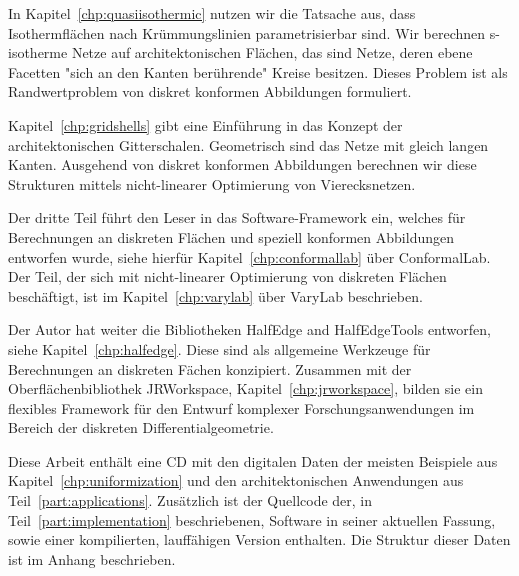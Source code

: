 \documentclass[Thesis.tex]{subfiles}
\begin{document}
In Kapitel~\ref{chp:quasiisothermic} nutzen wir die Tatsache aus, dass Isothermfl\"{a}chen nach Kr\"{u}mmungslinien parametrisierbar sind.
Wir berechnen s-isotherme Netze auf architektonischen Fl\"{a}chen, das sind Netze, deren ebene Facetten "sich an den Kanten ber\"{u}hrende" Kreise besitzen.
Dieses Problem ist als Randwertproblem von diskret konformen Abbildungen formuliert.

Kapitel~\ref{chp:gridshells} gibt eine Einf\"{u}hrung in das Konzept der architektonischen Gitterschalen.
Geometrisch sind das Netze mit gleich langen Kanten.
Ausgehend von diskret konformen Abbildungen berechnen wir diese Strukturen mittels nicht-linearer Optimierung von Vierecksnetzen.

Der dritte Teil f\"{u}hrt den Leser in das Software-Framework ein, welches f\"{u}r Berechnungen an diskreten Fl\"{a}chen und speziell konformen Abbildungen entworfen wurde, siehe hierf\"{u}r Kapitel~\ref{chp:conformallab} \"{u}ber {\sc ConformalLab}.
Der Teil, der sich mit nicht-linearer Optimierung von diskreten Fl\"{a}chen besch\"{a}ftigt, ist im Kapitel~\ref{chp:varylab} \"{u}ber {\sc VaryLab} beschrieben.

Der Autor hat weiter die Bibliotheken {\sc HalfEdge} and {\sc HalfEdgeTools} entworfen, siehe Kapitel~\ref{chp:halfedge}.
Diese sind als allgemeine Werkzeuge f\"ur Berechnungen an diskreten F\"{a}chen konzipiert.
Zusammen mit der Oberfl\"{a}chenbibliothek {\sc JRWorkspace}, Kapitel~\ref{chp:jrworkspace}, bilden sie ein flexibles Framework f\"{u}r den Entwurf komplexer Forschungsanwendungen im Bereich der diskreten Differentialgeometrie.

Diese Arbeit enth\"{a}lt eine CD mit den digitalen Daten der meisten Beispiele aus Kapitel~\ref{chp:uniformization} und den architektonischen Anwendungen aus Teil~\ref{part:applications}.
Zus\"{a}tzlich ist der Quellcode der, in Teil~\ref{part:implementation} beschriebenen, Software in seiner aktuellen Fassung, sowie einer kompilierten, lauff\"{a}higen Version enthalten.
Die Struktur dieser Daten ist im Anhang beschrieben.

\subfilebibliography
\end{document}
